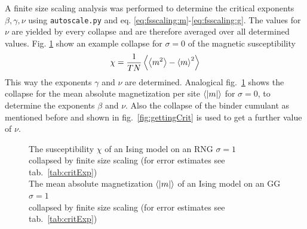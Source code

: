     A finite size scaling analysis was
    performed to determine the critical exponents \(\beta, \gamma, \nu\)
    using \texttt{autoscale.py} \cite{autoscale2009} and eq. \eqref{eq:fsscaling:m}-\eqref{eq:fsscaling:g}.
    The values for \(\nu\) are yielded by every collapse and are therefore
    averaged over all determined values. Fig. \ref{fig:gettingCrit2}
    show an example collapse for \(\sigma=0\) of the magnetic susceptibility
    \begin{equation}
        \chi = \frac{1}{TN}\left< \left< m^2 \right> - \left< m \right>^2 \right>
    \end{equation}
    This way the exponents \(\gamma\) and \(\nu\) are determined.
    Analogical fig.\ \ref{fig:gettingCrit2}
    shows the collapse for the mean absolute magnetization per site \(\left< \left\vert m\right\vert \right>\) for \(\sigma=0\),
    to determine the exponents \(\beta\) and \(\nu\).
    Also the collapse of the binder cumulant as mentioned before and shown
    in fig.\ \ref{fig:gettingCrit}
    is used to get a further value of \(\nu\).
    \begin{figure}[htbp]
        \centering
        \caption[Examples of Determining Critical Temperature and Exponents]
        {
             The susceptibility \(\chi\)
                of an Ising model on an RNG \(\sigma=1\)\\
             collapsed by finite
                size scaling (for error estimates see tab.\ \ref{tab:critExp})\\
             The mean absolute magnetization \(\left< \left\vert m\right\vert \right>\)
                of an Ising model on an GG \(\sigma=1\)\\
             collapsed by finite
                size scaling (for error estimates see tab.\ \ref{tab:critExp})
        }
        \label{fig:gettingCrit2}
    \end{figure}\\
